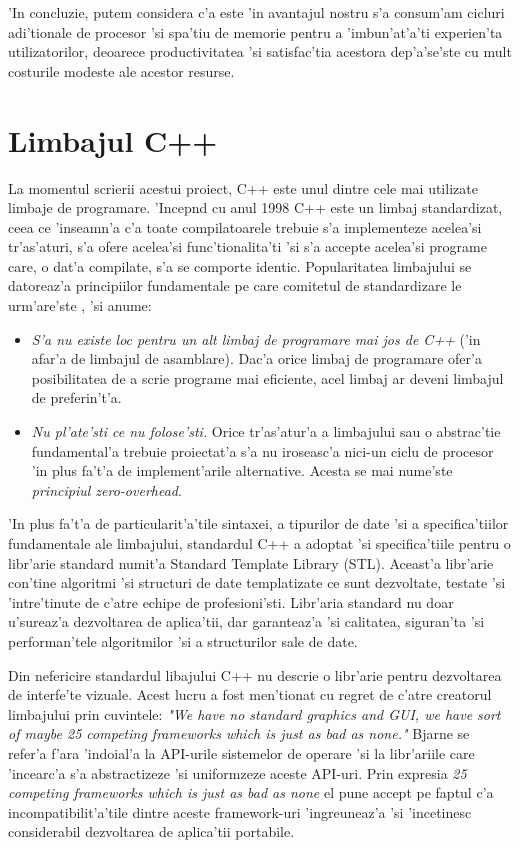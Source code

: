 \medskip

'In concluzie, putem considera c'a este 'in avantajul nostru s'a consum'am cicluri adi'tionale de procesor 'si spa'tiu de memorie pentru a 'imbun'at'a'ti experien'ta utilizatorilor, deoarece productivitatea 'si satisfac'tia acestora dep'a'se'ste cu mult costurile modeste ale acestor resurse.

\section{Limbajul C++}

La momentul scrierii acestui proiect, C++ este unul dintre cele mai utilizate limbaje de programare. 'Incep{\ia}nd cu anul 1998 C++ este un limbaj standardizat, ceea ce 'inseamn'a c'a toate compilatoarele trebuie s'a implementeze acelea'si tr'as'aturi, s'a ofere acelea'si func'tionalita'ti 'si s'a accepte acelea'si programe care, o dat'a compilate, s'a se comporte identic. Popularitatea limbajului se datoreaz'a principiilor fundamentale pe care comitetul de standardizare le urm'are'ste \cite{cpplang}, 'si anume:

\begin{itemize}
\item \textit{S'a nu existe loc pentru un alt limbaj de programare mai jos de C++} ('in afar'a de limbajul de asamblare). Dac'a orice limbaj de programare ofer'a posibilitatea de a scrie programe mai eficiente, acel limbaj ar deveni limbajul de preferin't'a.
\item \textit{Nu pl'ate'sti ce nu folose'sti.} Orice tr'as'atur'a a limbajului sau o abstrac'tie fundamental'a trebuie proiectat'a s'a nu iroseasc'a nici-un ciclu de procesor 'in plus fa't'a de implement'arile alternative. Acesta se mai nume'ste \textit{principiul zero-overhead}.
\end{itemize}

'In plus fa't'a de particularit'a'tile sintaxei, a tipurilor de date 'si a specifica'tiilor fundamentale ale limbajului, standardul C++ a adoptat 'si specifica'tiile pentru o libr'arie standard numit'a Standard Template Library (STL). Aceast'a libr'arie con'tine algoritmi 'si structuri de date templatizate ce sunt dezvoltate, testate 'si 'intre'tinute de c'atre echipe de profesioni'sti. Libr'aria standard nu doar u'sureaz'a dezvoltarea de aplica'tii, dar garanteaz'a 'si calitatea, siguran'ta 'si performan'tele algoritmilor 'si a structurilor sale de date.

\medskip

Din nefericire standardul libajului C++ nu descrie o libr'arie pentru dezvoltarea de interfe'te vizuale. Acest lucru a fost men'tionat cu regret de c'atre creatorul limbajului \cite{cppessence} prin cuvintele: 
\textit{"We have no standard graphics and GUI, we have sort of maybe 25 competing frameworks which is just as bad as none."} 
Bjarne se refer'a f'ara 'indoial'a la API-urile sistemelor de operare 'si la libr'ariile care 'incearc'a s'a abstractizeze 'si uniformzeze aceste API-uri. Prin expresia \textit{25 competing frameworks which is just as bad as none} el pune accept pe faptul c'a incompatibilit'a'tile dintre aceste framework-uri 'ingreuneaz'a 'si 'incetinesc considerabil dezvoltarea de aplica'tii portabile.

